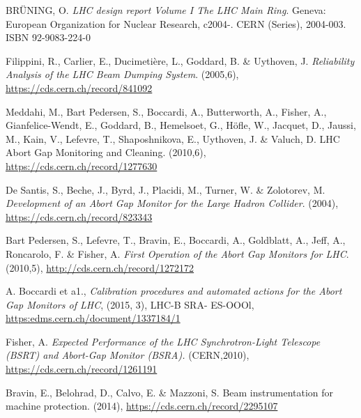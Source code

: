 %
{\printbibliography}{

    \begin{thebibliography}{99}
	
         BR\"UNING, O. \emph{LHC design report Volume I The LHC
            Main Ring}. Geneva: European Organization for Nuclear Research, c2004-. CERN
            (Series), 2004-003. ISBN 92-9083-224-0

         Filippini, R., Carlier, E., Ducimetière, L., Goddard,
            B. \& Uythoven, J. \emph{Reliability Analysis of the LHC Beam Dumping System}.
            (2005,6), \url{https://cds.cern.ch/record/841092}

        Meddahi, M., Bart Pedersen, S., Boccardi, A.,
            Butterworth, A., Fisher, A., Gianfelice-Wendt, E., Goddard, B., Hemelsoet,
            G., Höfle, W., Jacquet, D., Jaussi, M., Kain, V., Lefevre, T., Shaposhnikova,
            E., Uythoven, J. \& Valuch, D. LHC Abort Gap Monitoring and Cleaning.
            (2010,6), \url{https://cds.cern.ch/record/1277630}

        De Santis, S., Beche, J., Byrd, J., Placidi, M.,
            Turner, W. \& Zolotorev, M. \emph{Development of an Abort Gap Monitor for the
            Large Hadron Collider}.  (2004), \url{https://cds.cern.ch/record/823343}

        Bart Pedersen, S., Lefevre, T., Bravin, E., Boccardi, A.,
            Goldblatt, A., Jeff, A., Roncarolo, F. \& Fisher, A. \emph{First Operation of
            the Abort Gap Monitors for LHC}.  (2010,5), \url{http://cds.cern.ch/record/1272172}

         A. Boccardi et a1., \emph{Calibration procedures and
            automated actions for the Abort Gap Monitors of LHC}, (2015, 3), LHC-B SRA-
            ES-OOOl, \url{https:edms.cern.ch/document/1337184/1}

        Fisher, A. \emph{Expected Performance of the LHC
            Synchrotron-Light Telescope (BSRT) and Abort-Gap Monitor (BSRA).}
            (CERN,2010), \url{https://cds.cern.ch/record/1261191}

        Bravin, E., Belohrad, D., Calvo, E. \& Mazzoni, S. Beam
            instrumentation for machine protection.  (2014), \url{https://cds.cern.ch/record/2295107}


\end{thebibliography}}
